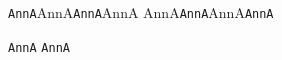 \documentclass[ngerman,%
cdfont=osf,
cdfont=ultrabold,
ttfont=roboto
]{tudscrreprt}
\begin{document}
\texttt{AnnA}AnnA\texttt{AnnA}AnnA%
AnnA\texttt{AnnA}AnnA\texttt{AnnA}

\texttt{AnnA}%
%
\texttt{AnnA}%

\blindtext
\texttt{\blindtext}

%
\end{document}
